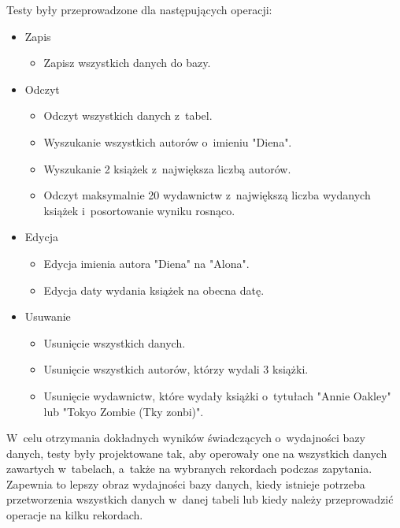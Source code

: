 Testy były przeprowadzone dla następujących operacji: 
\begin{itemize}
	 \item Zapis
  
  	\begin{itemize}
    		\item Zapisz wszystkich danych do bazy.
	 \end{itemize}

	  \item Odczyt
	  
   	  \begin{itemize}
   		 \item Odczyt wszystkich danych z~tabel.
	     \item Wyszukanie wszystkich autorów o~imieniu "Diena".
   		 \item Wyszukanie 2 książek z~największa liczbą autorów.
     	\item Odczyt maksymalnie 20 wydawnictw z~największą liczba wydanych książek i~posortowanie wyniku rosnąco.
  		\end{itemize}
  		
 	  \item Edycja

 	  	\begin{itemize}
	    		\item Edycja imienia autora "Diena" na "Alona".
	    		\item Edycja daty wydania książek na obecna datę.
		 \end{itemize}

	   \item Usuwanie
	   
	    	\begin{itemize}
	    		\item Usunięcie wszystkich danych.
	    		\item Usunięcie wszystkich autorów, którzy wydali 3 książki.
	    		\item Usunięcie wydawnictw, które wydały książki o~tytułach "Annie Oakley" lub "Tokyo Zombie (Tky zonbi)".
		 \end{itemize}	 
\end{itemize}

 W~celu otrzymania dokładnych wyników świadczących o~wydajności bazy danych, testy były projektowane tak, aby operowały one na wszystkich danych zawartych w~tabelach, a~także na wybranych rekordach podczas zapytania. Zapewnia to lepszy obraz wydajności bazy danych, kiedy istnieje potrzeba przetworzenia wszystkich danych w~danej tabeli lub kiedy należy przeprowadzić operacje na kilku rekordach. 

